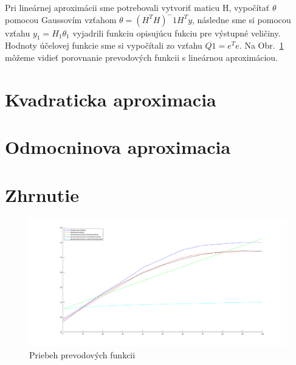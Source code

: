 \documentclass{article}
\begin{document}
Pri lineárnej aproximácii sme potrebovali vytvoriť maticu H, vypočítať \(\theta\) pomocou Gaussovím vzťahom \(\theta = (H^TH)^-1H^Ty\), následne sme si pomocou vzťahu \(y_1 = H_1\theta_1\) vyjadrili funkciu opisujúcu fukciu pre výstupné veličiny. Hodnoty účelovej funkcie sme si vypočítali zo vzťahu \(Q1 = e^Te\). Na Obr.~\ref{fig:prevod} môžeme vidieť porovnanie prevodových funkcii s lineárnou aproximáciou.

\clearpage

\section{Kvadraticka aproximacia}
\label{sec:kvad}

\clearpage

\section{Odmocninova aproximacia}
\label{sec:odm}

\clearpage



\section{Zhrnutie}
\label{sec:zhrnutie}

\begin{figure}[!htbp]
	\begin{center}
		\includegraphics[width=\textwidth]{./include/prevodove_funkcie.png}
		\caption{Priebeh prevodových funkcii}
		\label{fig:prevod}
	\end{center}
	\hfill
\end{figure}
\end{document}
